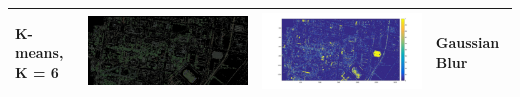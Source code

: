 \documentclass[fleqn,10pt]{SelfArx} %
\begin{document}
\begin{table}
\begin{tabular}{>{\centering\arraybackslash}M{8mm}cc>{\centering\arraybackslash}M{20mm}}
\midrule 
\vspace{-3cm}
\hspace{-0.6cm}
K-means, K = 6 & \includegraphics[clip,scale=0.07]{6rgb.jpg} & \includegraphics[trim={6cm 2.5cm 4.5cm 1.6cm},clip,scale=0.18]{6.jpg} & \vspace{-3cm}Gaussian Blur \\ 
\bottomrule
\end{tabular} 
\end{table}
\end{document}

